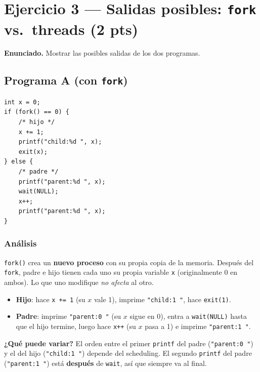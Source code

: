 \documentclass[11pt,a4paper]{article}
\begin{document}
\section{Ejercicio 3 --- Salidas posibles: \texttt{fork} vs.\ threads (2 pts)}

\textbf{Enunciado.} Mostrar las posibles salidas de los dos programas.

\subsection*{Programa A (con \texttt{fork})}

\begin{lstlisting}[style=cstyle]
int x = 0;
if (fork() == 0) {
    /* hijo */
    x += 1;
    printf("child:%d ", x);
    exit(x);
} else {
    /* padre */
    printf("parent:%d ", x);
    wait(NULL);
    x++;
    printf("parent:%d ", x);
}
\end{lstlisting}

\subsubsection*{Análisis}

\texttt{fork()} crea un \textbf{nuevo proceso} con su propia copia de
la memoria. Después del \texttt{fork}, padre e hijo tienen cada uno
su propia variable \texttt{x} (originalmente 0 en ambos). Lo que uno
modifique \emph{no afecta} al otro.

\begin{itemize}[leftmargin=*,nosep]
    \item \textbf{Hijo}: hace \texttt{x += 1} (su $x$ vale 1),
        imprime \texttt{"child:1 "}, hace \texttt{exit(1)}.
    \item \textbf{Padre}: imprime \texttt{"parent:0 "} (su $x$ sigue
        en 0), entra a \texttt{wait(NULL)} hasta que el hijo termine,
        luego hace \texttt{x++} (su $x$ pasa a 1) e imprime
        \texttt{"parent:1 "}.
\end{itemize}

\textbf{¿Qué puede variar?} El orden entre el primer \texttt{printf}
del padre (\texttt{"parent:0 "}) y el del hijo (\texttt{"child:1 "})
depende del scheduling. El segundo \texttt{printf} del padre
(\texttt{"parent:1 "}) está \textbf{después} de \texttt{wait}, así que
siempre va al final.
\end{document}
